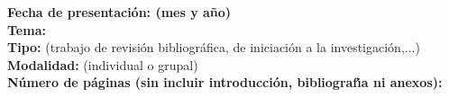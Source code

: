 \documentclass[a4paper, 12pt, oneside]{book}
\begin{document}
\begin{titlepage}
{\bf Fecha de presentaci\'{o}n: (mes y a\~{n}o)}\\

{\bf Tema:}\\

{\bf Tipo:} {(trabajo de revisi\'on bibliogr\'afica, de iniciaci\'on a la investigaci\'on,...)}\\

{\bf Modalidad:} {(individual o grupal)}\\

{\bf N\'umero de p\'aginas (sin incluir introducci\'on, bibliograf\'{\i}a ni anexos):}\\




\end{titlepage}
\newpage
\mbox{}
\thispagestyle{empty}
\end{document}

